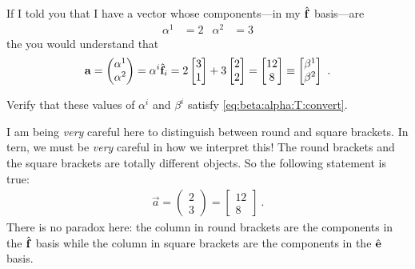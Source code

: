 If I told you that I have a vector whose components---in my $\hat{\mathbf{f}}$ basis---are
\begin{align}
    \alpha^1 &= 2 & \alpha^2 &= 3    
\end{align}
the you would understand that
\begin{align}
    \mathbf{a} 
    = \begin{pmatrix}
        \alpha^1 \\ \alpha^2
    \end{pmatrix}
    =
        \alpha^i \hat{\mathbf{f}}_i 
        =
        2
    \begin{bmatrix}
        3 \\ 1
    \end{bmatrix}
    +
    3
    \begin{bmatrix}
        2 \\ 2
    \end{bmatrix}
    =
    \begin{bmatrix}
        12 \\
        8
    \end{bmatrix} 
    \equiv
    \begin{bmatrix}
        \beta^1 \\
        \beta^2
    \end{bmatrix}
    \ .
\end{align}
\begin{exercise}
Verify that these values of $\alpha^i$ and $\beta^i$ satisfy \eqref{eq:beta:alpha:T:convert}.
\end{exercise}
I am being \emph{very} careful here to distinguish between round and square brackets.
In tern, we must be \emph{very} careful in how we interpret this! The round brackets and the square brackets are totally different objects. So the following statement is true:
\begin{align}
    \vec{a} = \begin{pmatrix}
        2 \\ 3
    \end{pmatrix}
    = 
    \begin{bmatrix}
        12 \\ 8
    \end{bmatrix} \ .
\end{align}
There is no paradox here: the column in round brackets are the components in the $\hat{\mathbf{f}}$ basis while the column in square brackets are the components in the $\hat{\mathbf{e}}$ basis. 


